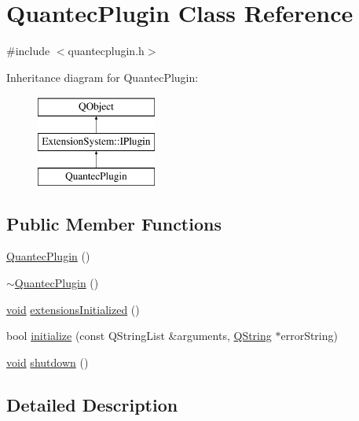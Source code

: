 \hypertarget{class_quantec_plugin}{\section{Quantec\-Plugin Class Reference}
\label{class_quantec_plugin}
}


{\ttfamily \#include $<$quantecplugin.\-h$>$}

Inheritance diagram for Quantec\-Plugin\-:\begin{figure}[H]
\begin{center}
\leavevmode
\includegraphics[height=3.000000cm]{class_quantec_plugin}
\end{center}
\end{figure}
\subsection*{Public Member Functions}
\begin{DoxyCompactItemize}
\item 
\hyperlink{group___boards___quantec_plugin_ga7e395a732723522846429499416b6660}{Quantec\-Plugin} ()
\item 
\hyperlink{group___boards___quantec_plugin_ga479a3e531eb28d6b2933cba448e348ba}{$\sim$\-Quantec\-Plugin} ()
\item 
\hyperlink{group___u_a_v_objects_plugin_ga444cf2ff3f0ecbe028adce838d373f5c}{void} \hyperlink{group___boards___quantec_plugin_ga947364f26b2004a6f8706e053e9200c9}{extensions\-Initialized} ()
\item 
bool \hyperlink{group___boards___quantec_plugin_ga74803b604ba599f20ee7a45dddbd7ead}{initialize} (const Q\-String\-List \&arguments, \hyperlink{group___u_a_v_objects_plugin_gab9d252f49c333c94a72f97ce3105a32d}{Q\-String} $\ast$error\-String)
\item 
\hyperlink{group___u_a_v_objects_plugin_ga444cf2ff3f0ecbe028adce838d373f5c}{void} \hyperlink{group___boards___quantec_plugin_ga775ecc021e3638b3652f5e49edd2f748}{shutdown} ()
\end{DoxyCompactItemize}


\subsection{Detailed Description}


